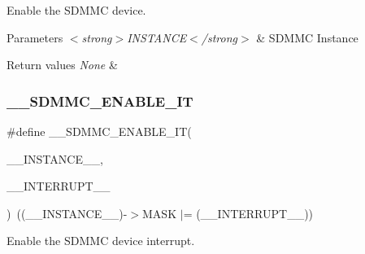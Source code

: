 Enable the S\+D\+M\+MC device. 


\begin{DoxyParams}{Parameters}
{\em $<$strong$>$\+I\+N\+S\+T\+A\+N\+C\+E$<$/strong$>$} & S\+D\+M\+MC Instance\\
\hline
\end{DoxyParams}

\begin{DoxyRetVals}{Return values}
{\em None} & \\
\hline
\end{DoxyRetVals}
\mbox{\label{group___s_d_m_m_c___l_l___interrupt___clock_ga086886ffa7d502709c637568ed6e0466}} 
\subsubsection{\texorpdfstring{\_\_SDMMC\_ENABLE\_IT}{\_\_SDMMC\_ENABLE\_IT}}
{\footnotesize\ttfamily \#define \+\_\+\+\_\+\+S\+D\+M\+M\+C\+\_\+\+E\+N\+A\+B\+L\+E\+\_\+\+IT(\begin{DoxyParamCaption}\item[{}]{\+\_\+\+\_\+\+I\+N\+S\+T\+A\+N\+C\+E\+\_\+\+\_\+,  }\item[{}]{\+\_\+\+\_\+\+I\+N\+T\+E\+R\+R\+U\+P\+T\+\_\+\+\_\+ }\end{DoxyParamCaption})~((\+\_\+\+\_\+\+I\+N\+S\+T\+A\+N\+C\+E\+\_\+\+\_\+)-\/$>$M\+A\+SK $\vert$= (\+\_\+\+\_\+\+I\+N\+T\+E\+R\+R\+U\+P\+T\+\_\+\+\_\+))}



Enable the S\+D\+M\+MC device interrupt. 


